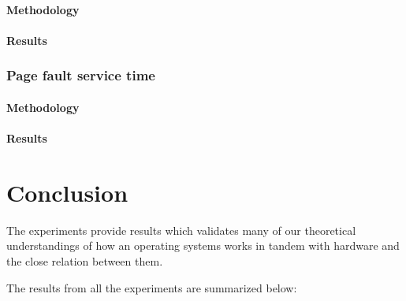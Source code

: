 \documentclass[conference]{IEEEtran}
\begin{document}
\paragraph{Methodology}

\paragraph{Results}


\subsubsection{Page fault service time}

\paragraph{Methodology}

\paragraph{Results}




\section{Conclusion}

The experiments provide results which validates many of our theoretical understandings of how an operating systems works in tandem with hardware and the close relation between them.
\par The results from all the experiments are summarized below:\\
\end{document}
